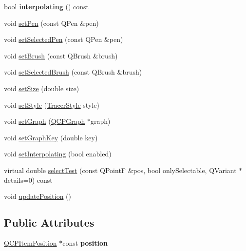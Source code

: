 \begin{DoxyCompactItemize}
bool {\bfseries interpolating} () const
\item 
void \mbox{\hyperlink{class_q_c_p_item_tracer_af8048636fc1ef0152e51809b008df2ca}{set\+Pen}} (const Q\+Pen \&pen)
\item 
void \mbox{\hyperlink{class_q_c_p_item_tracer_ae1bf70db7f13f928660168cd3e5069f3}{set\+Selected\+Pen}} (const Q\+Pen \&pen)
\item 
void \mbox{\hyperlink{class_q_c_p_item_tracer_a2c303f7470a30084daa201ed556b3c36}{set\+Brush}} (const Q\+Brush \&brush)
\item 
void \mbox{\hyperlink{class_q_c_p_item_tracer_a0f55c084980a7a312af859d3e7b558ef}{set\+Selected\+Brush}} (const Q\+Brush \&brush)
\item 
void \mbox{\hyperlink{class_q_c_p_item_tracer_ae47fe0617f5fef5fdb766999569be10a}{set\+Size}} (double size)
\item 
void \mbox{\hyperlink{class_q_c_p_item_tracer_a41a2ac4f1acd7897b4e2a2579c03204e}{set\+Style}} (\mbox{\hyperlink{class_q_c_p_item_tracer_a2f05ddb13978036f902ca3ab47076500}{Tracer\+Style}} style)
\item 
void \mbox{\hyperlink{class_q_c_p_item_tracer_af5886f4ded8dd68cb4f3388f390790c0}{set\+Graph}} (\mbox{\hyperlink{class_q_c_p_graph}{Q\+C\+P\+Graph}} $\ast$graph)
\item 
void \mbox{\hyperlink{class_q_c_p_item_tracer_a6840143b42f3b685cedf7c6d83a704c8}{set\+Graph\+Key}} (double key)
\item 
void \mbox{\hyperlink{class_q_c_p_item_tracer_a6c244a9d1175bef12b50afafd4f5fcd2}{set\+Interpolating}} (bool enabled)
\item 
virtual double \mbox{\hyperlink{class_q_c_p_item_tracer_ae1dc728384936184e7552a6d0d67fd75}{select\+Test}} (const Q\+PointF \&pos, bool only\+Selectable, Q\+Variant $\ast$details=0) const
\item 
void \mbox{\hyperlink{class_q_c_p_item_tracer_a5b90296109e36384aedbc8908a670413}{update\+Position}} ()
\end{DoxyCompactItemize}
\subsection*{Public Attributes}
\begin{DoxyCompactItemize}
\item 
\mbox{\label{class_q_c_p_item_tracer_a69917e2fdb2b3a929c196958feee7cbe}} 
\mbox{\hyperlink{class_q_c_p_item_position}{Q\+C\+P\+Item\+Position}} $\ast$const {\bfseries position}
\end{DoxyCompactItemize}
